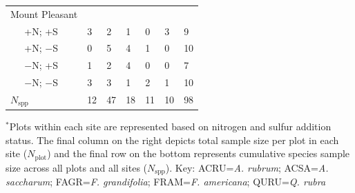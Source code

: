 \begin{table}[h!]
{\begin{tabular}{p{0.5cm}p{2cm}|p{1cm}p{1cm}p{1cm}p{1cm}p{1cm}|p{1cm}}
        \multicolumn{2}{l}{Mount Pleasant}  &    &    &    &    &    &    \\
                    & +N; +S                & 3  & 2  & 1  & 0  & 3  & 9  \\
                    & +N; $-$S              & 0  & 5  & 4  & 1  & 0  & 10 \\
                    & $-$N; +S              & 1  & 2  & 4  & 0  & 0  & 7  \\
                    & $-$N; $-$S            & 3  & 3  & 1  & 2  & 1  & 10 \\
      \hline
      \multicolumn{2}{l}{$N_\mathrm{spp}$}  & 12 & 47 & 18 & 11 & 10 & 98
      \end{tabular}%
      }
      \end{table}
      \begin{singlespace}
        \noindent $^*$Plots within each site are represented based on nitrogen and sulfur addition status. The final column on the right depicts total sample size per plot in each site ($N_\mathrm{plot}$) and the final row on the bottom represents cumulative species sample size across all plots and all sites ($N_\mathrm{spp}$). Key: ACRU=\textit{A. rubrum}; ACSA=\textit{A. saccharum}; FAGR=\textit{F. grandifolia}; FRAM=\textit{F. americana}; QURU=\textit{Q. rubra}
      \end{singlespace}
    \clearpage

